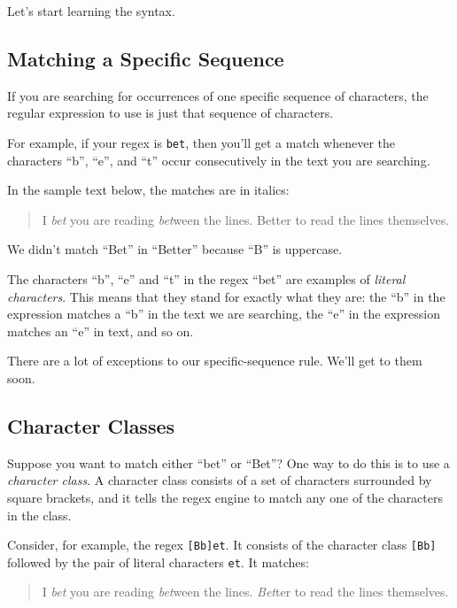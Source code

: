 \documentclass[]{book}
\theoremstyle{definition}
\theoremstyle{definition}
\theoremstyle{definition}
\theoremstyle{remark}
\begin{document}
{Let's start learning the syntax.

\subsection{Matching a Specific
Sequence}\label{matching-a-specific-sequence}

If you are searching for occurrences of one specific sequence of
characters, the regular expression to use is just that sequence of
characters.

For example, if your regex is \texttt{bet}, then you'll get a match
whenever the characters ``b'', ``e'', and ``t'' occur consecutively in
the text you are searching.

In the sample text below, the matches are in italics:

\begin{quote}
I \emph{bet} you are reading \emph{bet}ween the lines. Better to read
the lines themselves.
\end{quote}

We didn't match ``Bet'' in ``Better'' because ``B'' is uppercase.

The characters ``b'', ``e'' and ``t'' in the regex ``bet'' are examples
of \emph{literal characters}. This means that
they stand for exactly what they are: the ``b'' in the expression
matches a ``b'' in the text we are searching, the ``e'' in the
expression matches an ``e'' in text, and so on.

There are a lot of exceptions to our specific-sequence rule. We'll get
to them soon.

\subsection{Character Classes}\label{character-classes}

Suppose you want to match either ``bet'' or ``Bet''? One way to do this
is to use a \emph{character class}. A character class
 consists of a set of characters surrounded by
square brackets, and it tells the regex engine to match any one of the
characters in the class.

Consider, for example, the regex \texttt{{[}Bb{]}et}. It consists of the
character class \texttt{{[}Bb{]}} followed by the pair of literal
characters \texttt{et}. It matches:

\begin{quote}
I \emph{bet} you are reading \emph{bet}ween the lines. \emph{Bet}ter to
read the lines themselves.
\end{quote}

}
\end{document}
